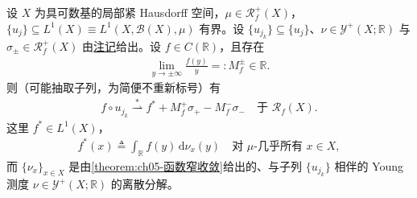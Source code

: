 \documentclass[../../main.tex]{subfiles}
\begin{document}
\begin{proposition}\label{proposition:ch05-函数弱星}\label{proposition:ch05-5.4.13}
设 $X$ 为具可数基的局部紧 Hausdorff 空间，$\mu\in\mathscr{R}^+_f(X)$，$\{u_j\}\subseteq L^1(X)\equiv L^1(X,\mathscr{B}(X),\mu)$ 有界。设 $\{u_{j_k}\}\subseteq\{u_j\}$、$\nu\in\mathcal{Y}^+(X;\mathbb{R})$ 与 $\sigma_\pm\in\mathscr{R}^+_f(X)$ 由\hyperref[remark:ch05-5.4.5]{注记}给出。设 $f\in C(\mathbb{R})$，且存在
\begin{align}
\lim_{y\to\pm\infty}\frac{f(y)}{y}=:M^\pm_f\in\mathbb{R}.\label{align:ch05-5.106}
\end{align}
则（可能抽取子列，为简便不重新标号）有
\begin{align}
f\circ u_{j_k}\stackrel{*}{\rightharpoonup}f^*+M^+_f\sigma_+-M^-_f\sigma_-
\quad\text{于 }\mathscr{R}_f(X).\label{align:ch05-5.107}
\end{align}
这里 $f^*\in L^1(X)$，
\begin{align}
f^*(x)\triangleq\int_{\mathbb{R}}f(y)\,\mathrm{d}\nu_x(y)
\quad\text{对 }\mu\text{-几乎所有 }x\in X,\label{align:ch05-5.108}
\end{align}
而 $\{\nu_x\}_{x\in X}$ 是由\cref{theorem:ch05-函数窄收敛}给出的、与子列 $\{u_{j_k}\}$ 相伴的 Young 测度 $\nu\in\mathcal{Y}^+(X;\mathbb{R})$ 的离散分解。
\end{proposition}
\end{document}
